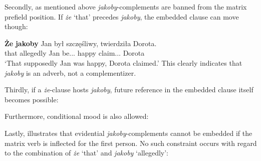 \documentclass[output=paper]{langsci/langscibook}
\begin{document}
Secondly, as mentioned above \emph{jakoby}-complements are banned from the matrix prefield position. If \emph{że} `that' precedes \emph{jakoby}, the embedded clause can move though:

\ea \gll \textbf{Że} \textbf{jakoby} Jan był szczęśliwy, twierdziła Dorota. \\
		 that allegedly Jan be.{\lptcp}.{\sg}.{\masc} happy  claim.{\lptcp}.{\sg}.{\fem} Dorota \\
\glt	`That supposedly Jan was happy, Dorota claimed.'
\z
This clearly indicates that \emph{jakoby} is an adverb, not a complementizer.

Thirdly, if a \emph{że}-clause hosts \emph{jakoby}, future reference in the embedded clause itself becomes possible:

\ea {}
\z\z

\noindent  Furthermore, conditional mood is also allowed:

\ea {}
\z\z

\noindent  Lastly,  illustrates that evidential \emph{jakoby}-complements cannot be embedded if the matrix verb is inflected for the first person. No such constraint occurs with regard to the combination of \emph{że} `that' and \emph{jakoby} `allegedly':
\end{document}

